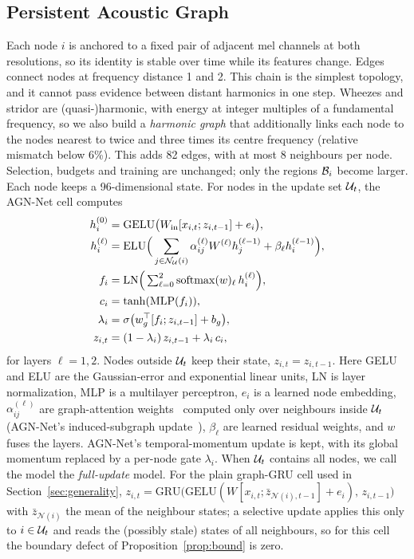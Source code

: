 \subsection{Persistent Acoustic Graph}
\label{sec:graph}
Each node $i$ is anchored to a fixed pair of adjacent mel channels at both resolutions, so its identity is stable over time while its features change. Edges connect nodes at frequency distance 1 and 2. This chain is the simplest topology, and it cannot pass evidence between distant harmonics in one step. Wheezes and stridor are (quasi-)harmonic, with energy at integer multiples of a fundamental frequency, so we also build a \emph{harmonic graph} that additionally links each node to the nodes nearest to twice and three times its centre frequency (relative mismatch below 6\%). This adds 82 edges, with at most 8 neighbours per node. Selection, budgets and training are unchanged; only the regions $\mathcal{B}_i$ become larger. Each node keeps a 96-dimensional state. For nodes in the update set $\mathcal{U}_t$, the AGN-Net cell computes
\begin{align}
h^{(0)}_i &= \mathrm{GELU}\big(W_{\mathrm{in}}[x_{i,t};z_{i,t-1}] + e_i\big),\label{eq:cell-first}\\
h^{(\ell)}_i &= \mathrm{ELU}\Big(\sum_{j\in\mathcal{N}_{\mathcal{U}}(i)}\alpha^{(\ell)}_{ij}W^{(\ell)}h^{(\ell-1)}_j+\beta_\ell h^{(\ell-1)}_i\Big),\\
f_i &= \mathrm{LN}\Big(\textstyle\sum_{\ell=0}^{2}\mathrm{softmax}(w)_\ell\,h^{(\ell)}_i\Big),\\
c_i &= \tanh(\mathrm{MLP}(f_i)),\\
\lambda_i &= \sigma\big(w_g^\top[f_i;z_{i,t-1}]+b_g\big),\\
z_{i,t} &= (1-\lambda_i)\,z_{i,t-1}+\lambda_i\,c_i,\label{eq:cell-update}
\end{align}
for layers $\ell=1,2$. Nodes outside $\mathcal{U}_t$ keep their state, $z_{i,t}=z_{i,t-1}$. Here GELU and ELU are the Gaussian-error and exponential linear units, LN is layer normalization, MLP is a multilayer perceptron, $e_i$ is a learned node embedding, $\alpha^{(\ell)}_{ij}$ are graph-attention weights~\cite{velickovic2018graph} computed only over neighbours inside $\mathcal{U}_t$ (AGN-Net's induced-subgraph update~\cite{islam2026agnnet}), $\beta_\ell$ are learned residual weights, and $w$ fuses the layers. AGN-Net's temporal-momentum update is kept, with its global momentum replaced by a per-node gate $\lambda_i$. When $\mathcal{U}_t$ contains all nodes, we call the model the \emph{full-update} model. For the plain graph-GRU cell used in Section~\ref{sec:generality}, $z_{i,t}=\mathrm{GRU}\big(\mathrm{GELU}(W[x_{i,t};\bar z_{\mathcal{N}(i),t-1}]+e_i),\,z_{i,t-1}\big)$ with $\bar z_{\mathcal{N}(i)}$ the mean of the neighbour states; a selective update applies this only to $i\in\mathcal{U}_t$ and reads the (possibly stale) states of all neighbours, so for this cell the boundary defect of Proposition~\ref{prop:bound} is zero.

